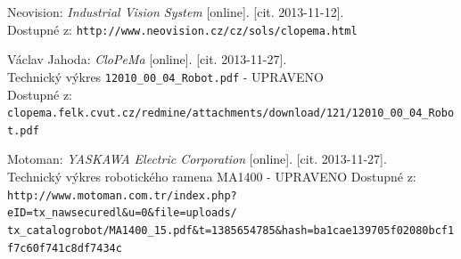 \documentclass[10pt,a4paper,titlepage,oneside]{report}
\begin{document}


\begin{thebibliography}{CPM}    
   Neovision:
    \emph{Industrial Vision System} [online]. [cit. 2013-11-12].\\
    Dostupné z: \verb|http://www.neovision.cz/cz/sols/clopema.html|    
  
   Václav Jahoda:
    \emph{CloPeMa} [online]. [cit. 2013-11-27].\\
    Technický výkres \verb|12010_00_04_Robot.pdf| - UPRAVENO\\
    Dostupné z: \verb|clopema.felk.cvut.cz/redmine/attachments/download/121/12010_00_04_Robot.pdf|    
    
   Motoman:
    \emph{YASKAWA Electric Corporation} [online]. [cit. 2013-11-27].\\
    Technický výkres robotického ramena MA1400 - UPRAVENO
    Dostupné z: \verb|http://www.motoman.com.tr/index.php?eID=tx_nawsecuredl&u=0&file=uploads/|\\
    \verb|tx_catalogrobot/MA1400_15.pdf&t=1385654785&hash=ba1cae139705f02080bcf1f7c60f741c8df7434c| 
\end{thebibliography}
\end{document}
